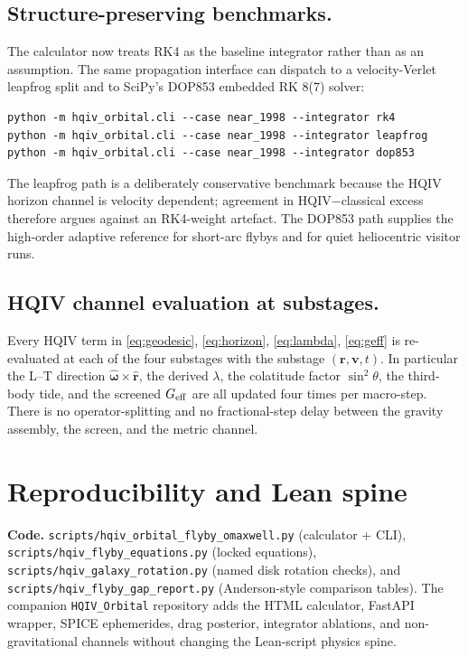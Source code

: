 \documentclass[11pt]{amsart}
\begin{document}
\subsection{Structure-preserving benchmarks.}
The calculator now treats RK4 as the baseline integrator rather than as an assumption. The
same propagation interface can dispatch to a velocity-Verlet leapfrog split and to SciPy's
DOP853 embedded RK 8(7) solver:
\begin{verbatim}
python -m hqiv_orbital.cli --case near_1998 --integrator rk4
python -m hqiv_orbital.cli --case near_1998 --integrator leapfrog
python -m hqiv_orbital.cli --case near_1998 --integrator dop853
\end{verbatim}
The leapfrog path is a deliberately conservative benchmark because the HQIV horizon channel
is velocity dependent; agreement in HQIV$-$classical excess therefore argues against an
RK4-weight artefact. The DOP853 path supplies the high-order adaptive reference for
short-arc flybys and for quiet heliocentric visitor runs.

\subsection{HQIV channel evaluation at substages.}
Every HQIV term in \eqref{eq:geodesic}, \eqref{eq:horizon}, \eqref{eq:lambda}, \eqref{eq:geff}
is re-evaluated at each of the four substages with the substage $(\mathbf r,\mathbf v,t)$.
In particular the L--T direction $\hat{\boldsymbol\omega}\times\hat{\mathbf r}$, the derived
$\lambda$, the colatitude factor $\sin^2\theta$, the third-body tide, and the screened
$G_{\rm eff}$ are all updated four times per macro-step. There is no operator-splitting and
no fractional-step delay between the gravity assembly, the screen, and the metric channel.

\section{Reproducibility and Lean spine}\label{sec:repro}

\textbf{Code.} \texttt{scripts/hqiv\_orbital\_flyby\_omaxwell.py} (calculator + CLI),
\texttt{scripts/hqiv\_flyby\_equations.py} (locked equations),
\texttt{scripts/hqiv\_galaxy\_rotation.py} (named disk rotation checks), and
\texttt{scripts/hqiv\_flyby\_gap\_report.py} (Anderson-style comparison tables). The
companion \texttt{HQIV\_Orbital} repository adds the HTML calculator, FastAPI wrapper,
SPICE ephemerides, drag posterior, integrator ablations, and non-gravitational channels
without changing the Lean-script physics spine.
\end{document}
